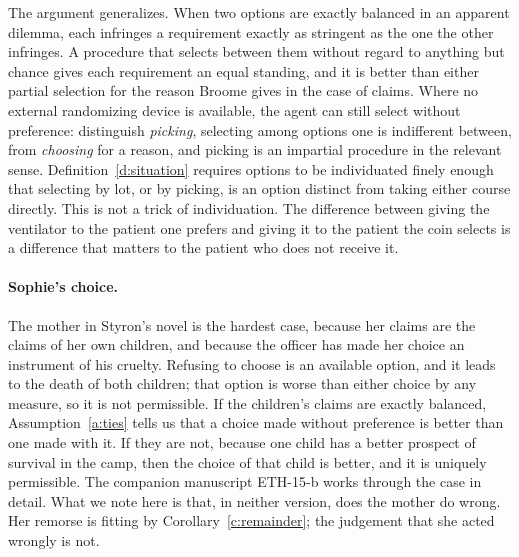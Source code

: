 \documentclass{situationist-preprint}
\begin{document}
The argument generalizes. When two options are exactly balanced in an apparent dilemma, each infringes a requirement exactly as stringent as the one the other infringes. A procedure that selects between them without regard to anything but chance gives each requirement an equal standing, and it is better than either partial selection for the reason Broome gives in the case of claims. Where no external randomizing device is available, the agent can still select without preference: \citet{UllmannMargalitMorgenbesser1977} distinguish \emph{picking}, selecting among options one is indifferent between, from \emph{choosing} for a reason, and picking is an impartial procedure in the relevant sense. Definition~\ref{d:situation} requires options to be individuated finely enough that selecting by lot, or by picking, is an option distinct from taking either course directly. This is not a trick of individuation. The difference between giving the ventilator to the patient one prefers and giving it to the patient the coin selects is a difference that matters to the patient who does not receive it.

\paragraph{Sophie's choice.} The mother in Styron's novel is the hardest case, because her claims are the claims of her own children, and because the officer has made her choice an instrument of his cruelty. Refusing to choose is an available option, and it leads to the death of both children; that option is worse than either choice by any measure, so it is not permissible. If the children's claims are exactly balanced, Assumption~\ref{a:ties} tells us that a choice made without preference is better than one made with it. If they are not, because one child has a better prospect of survival in the camp, then the choice of that child is better, and it is uniquely permissible. The companion manuscript ETH-15-b works through the case in detail. What we note here is that, in neither version, does the mother do wrong. Her remorse is fitting by Corollary~\ref{c:remainder}; the judgement that she acted wrongly is not.
\end{document}
